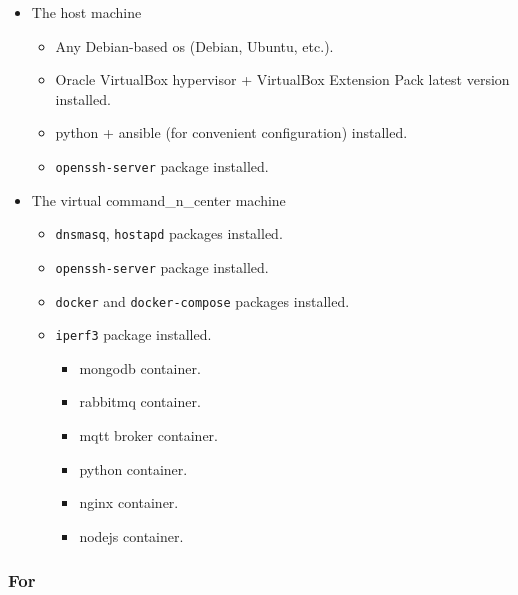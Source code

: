 \begin{itemize}
\tightlist
\item
  The host machine

\begin{itemize}
	\tightlist
	\item
	Any Debian-based \acrshort{os} (Debian, Ubuntu, etc.).
	\item
	Oracle VirtualBox hypervisor + VirtualBox Extension Pack latest version installed.
	\item
	\gls{python} + \gls{ansible} (for convenient configuration) installed.
	\item
	\texttt{openssh-server} package installed.
\end{itemize}
\item
  The virtual \gls{command_n_center} machine

  \begin{itemize}
  \tightlist
  \item
    \texttt{dnsmasq}, \texttt{hostapd} packages installed.
  \item
    \texttt{openssh-server} package installed.
  \item
    \texttt{docker} and \texttt{docker-compose} packages installed.
  \item
  	\texttt{iperf3} package installed.

    \begin{itemize}
    \tightlist
    \item
      \gls{mongodb} container.
    \item
      \gls{rabbitmq} container.
    \item
      \acrshort{mqtt} \gls{broker} container.
    \item
      \gls{python} container.
    \item
      \gls{nginx} container.
    \item
      \gls{nodejs} container.
    \end{itemize}
  \end{itemize}
\end{itemize}

\subsubsection{For }\label{for-aps}

